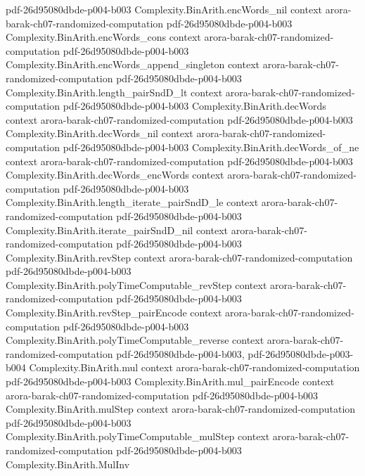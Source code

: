 \begin{theorem}
  {pdf-26d95080dbde-p004-b003}
\proofstep
  {Complexity.BinArith.encWords_nil}
  {context}
  {arora-barak-ch07-randomized-computation}
  {pdf-26d95080dbde-p004-b003}
\proofstep
  {Complexity.BinArith.encWords_cons}
  {context}
  {arora-barak-ch07-randomized-computation}
  {pdf-26d95080dbde-p004-b003}
\proofstep
  {Complexity.BinArith.encWords_append_singleton}
  {context}
  {arora-barak-ch07-randomized-computation}
  {pdf-26d95080dbde-p004-b003}
\proofstep
  {Complexity.BinArith.length_pairSndD_lt}
  {context}
  {arora-barak-ch07-randomized-computation}
  {pdf-26d95080dbde-p004-b003}
\proofstep
  {Complexity.BinArith.decWords}
  {context}
  {arora-barak-ch07-randomized-computation}
  {pdf-26d95080dbde-p004-b003}
\proofstep
  {Complexity.BinArith.decWords_nil}
  {context}
  {arora-barak-ch07-randomized-computation}
  {pdf-26d95080dbde-p004-b003}
\proofstep
  {Complexity.BinArith.decWords_of_ne}
  {context}
  {arora-barak-ch07-randomized-computation}
  {pdf-26d95080dbde-p004-b003}
\proofstep
  {Complexity.BinArith.decWords_encWords}
  {context}
  {arora-barak-ch07-randomized-computation}
  {pdf-26d95080dbde-p004-b003}
\proofstep
  {Complexity.BinArith.length_iterate_pairSndD_le}
  {context}
  {arora-barak-ch07-randomized-computation}
  {pdf-26d95080dbde-p004-b003}
\proofstep
  {Complexity.BinArith.iterate_pairSndD_nil}
  {context}
  {arora-barak-ch07-randomized-computation}
  {pdf-26d95080dbde-p004-b003}
\proofstep
  {Complexity.BinArith.revStep}
  {context}
  {arora-barak-ch07-randomized-computation}
  {pdf-26d95080dbde-p004-b003}
\proofstep
  {Complexity.BinArith.polyTimeComputable_revStep}
  {context}
  {arora-barak-ch07-randomized-computation}
  {pdf-26d95080dbde-p004-b003}
\proofstep
  {Complexity.BinArith.revStep_pairEncode}
  {context}
  {arora-barak-ch07-randomized-computation}
  {pdf-26d95080dbde-p004-b003}
\proofstep
  {Complexity.BinArith.polyTimeComputable_reverse}
  {context}
  {arora-barak-ch07-randomized-computation}
  {pdf-26d95080dbde-p004-b003,
    pdf-26d95080dbde-p003-b004}
\proofstep
  {Complexity.BinArith.mul}
  {context}
  {arora-barak-ch07-randomized-computation}
  {pdf-26d95080dbde-p004-b003}
\proofstep
  {Complexity.BinArith.mul_pairEncode}
  {context}
  {arora-barak-ch07-randomized-computation}
  {pdf-26d95080dbde-p004-b003}
\proofstep
  {Complexity.BinArith.mulStep}
  {context}
  {arora-barak-ch07-randomized-computation}
  {pdf-26d95080dbde-p004-b003}
\proofstep
  {Complexity.BinArith.polyTimeComputable_mulStep}
  {context}
  {arora-barak-ch07-randomized-computation}
  {pdf-26d95080dbde-p004-b003}
\proofstep
  {Complexity.BinArith.MulInv}

\end{theorem}
